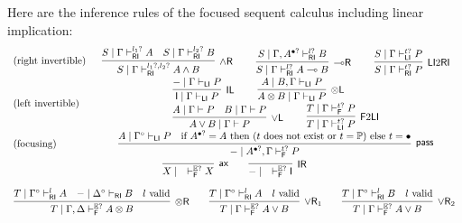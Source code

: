 \documentclass[submission,copyright,creativecommons]{eptcs}
\theoremstyle{definition}
\newcommand{\tl}{\otimes \mathsf{L}}
\newcommand{\tr}{\otimes \mathsf{R}}
\newcommand{\lright}{{\multimap}\mathsf{R}}
\newcommand{\pass}{\mathsf{pass}}
\newcommand{\unitl}{\mathsf{IL}}
\newcommand{\unitr}{\mathsf{IR}}
\newcommand{\andr}{\land \mathsf{R}}
\newcommand{\orl}{\lor \mathsf{L}}
\newcommand{\orrone}{\lor \mathsf{R}_{1}}
\newcommand{\orrtwo}{\lor \mathsf{R}_{2}}
\newcommand{\ax}{\mathsf{ax}}
\newcommand{\ot}{\otimes}
\newcommand{\lolli}{\multimap}
\newcommand{\I}{\mathsf{I}}
\newcommand{\RI}{\mathsf{RI}}
\newcommand{\LI}{\mathsf{LI}}
\newcommand{\F}{\mathsf{F}}
\newcommand{\tP}{\mathbb{P}}
\newcommand{\tE}{\mathbb{E}}
\newcommand{\proofbox}[1]{\begin{tabular}{l} #1 \end{tabular}}
\begin{document}
Here are the inference rules of the focused sequent calculus including linear implication:
\begin{equation*}\label{eq:focus:impl}
  \begin{array}{lc}
    \text{(right invertible)} & %
    \proofbox{
      \infer[\andr]{S \mid \Gamma \vdash^{l_1?, l_2?}_{\RI} A \land B}{
        S \mid \Gamma \vdash^{l_1?}_{\RI} A
        &
        S \mid \Gamma \vdash^{l_2?}_{\RI} B
      }
    \qquad
    \infer[\lright]{S \mid \Gamma \vdash^{l?}_{\RI} A \lolli B}{S \mid \Gamma , A^{\bullet ?} \vdash^{l?}_{\RI} B}
    \qquad
    \infer[\LI 2 \RI]{S \mid \Gamma \vdash^{t?}_{\RI} P}{S \mid \Gamma \vdash^{t?}_{\LI} P}
    }
    \\[10pt]
    \text{(left invertible)} & %
    \proofbox{
      \infer[\unitl]{\I \mid \Gamma \vdash_{\LI} P}{{-} \mid \Gamma \vdash_{\LI} P}
    \qquad
    \infer[\tl]{A \ot B \mid \Gamma \vdash_{\LI} P}{A \mid B , \Gamma \vdash_{\LI} P}
    \\
    \infer[\orl]{A \lor B \mid \Gamma \vdash P}{
      A \mid \Gamma \vdash P
      &
      B \mid \Gamma \vdash P
    }
    \qquad
    \infer[\F 2 \LI]{T \mid \Gamma \vdash^{t?}_{\LI} P}{T \mid \Gamma \vdash^{t?}_{\F} P}
    }
    \\[10pt]
    \text{(focusing)} &    %
    \proofbox{
    \infer[\pass]{{-} \mid A^{\bullet ?} , \Gamma \vdash^{t?}_{\F} P }{
        A \mid \Gamma^{\circ} \vdash_{\LI} P
        &
        \text{if } A^{\bullet?} = A \text{ then } (t \text{ does not exist or } t = \tP) \text{ else } t = \bullet
    }
    }
    \\[10pt]
    \multicolumn{2}{c}{
    \infer[\ax]{X \mid \quad \vdash^{\tE?}_{\F} X}{}
    \qquad
    \infer[\unitr]{{-} \mid \quad \vdash^{\tE?}_{\F} \I}{}
    }
    \\[10pt]
    \multicolumn{2}{c}{
    \infer[\tr]{T \mid \Gamma , \Delta \vdash^{\tE?}_{\F} A \ot B}{
      T \mid \Gamma^{\circ} \vdash^{l}_{\RI} A
      &
      {-} \mid \Delta^{\circ} \vdash_{\RI} B
      &
      l \ \text{valid}
    }
    \qquad
    \infer[\orrone]{T \mid \Gamma \vdash^{\tE?}_{\F} A \lor B}{
      T \mid \Gamma^{\circ} \vdash^{l}_{\RI} A
      &
      l \ \text{valid}
    }
    \qquad
    \infer[\orrtwo]{T \mid \Gamma \vdash^{\tE?}_{\F} A \lor B}{
      T \mid \Gamma^{\circ} \vdash^{l}_{\RI} B
      &
      l \ \text{valid}
    }
    }
    \\[6pt]

\end{array}
\end{equation*}
\end{document}

